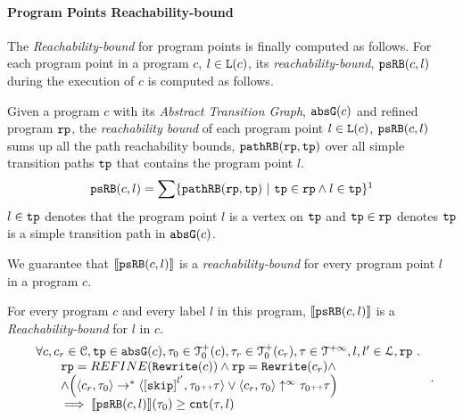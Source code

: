 \paragraph{Program Points Reachability-bound}
The \emph{Reachability-bound} for program points is finally computed as follows.
For each program point in a program $c$, $l \in \mathtt{L}(c)$,
its \emph{reachability-bound}, $\mathtt{psRB}(c, l)$ during the execution of $c$ is computed as follows.
%
\begin{defn}
\label{def:point_psrb}
Given a program $c$ with its \emph{Abstract Transition Graph}, $\mathtt{abs}{\mathtt{G}}(c)$ and refined program $\mathtt{rp}$,
the \emph{reachability bound} of each program point $l \in \mathtt{L}(c)$, $\mathtt{psRB}(c, l)$ 
sums up all the path reachability bounds, $\mathtt{pathRB}(\mathtt{rp}, \mathtt{tp})$ over all simple transition paths $\mathtt{tp}$ that contains the program point $l$.
\[ 
  \psRB(c, l) = 
  \sum
  \left\{ \inoutB(\rprog, \tpath) ~\vert~ \tpath \in \rprog \land 
  l \in \tpath \right\}\footnotemark
\]
$l \in \mathtt{tp}$ denotes that the program point $l$ is a vertex on $\mathtt{tp}$ 
and $\mathtt{tp} \in \mathtt{rp}$ denotes $\mathtt{tp}$ is a simple transition path in $\mathtt{abs}{\mathtt{G}}(c)$.
\end{defn}
We guarantee that $\llbracket \mathtt{psRB}(c, l) \rrbracket$ is a \emph{reachability-bound} for every program point $l$ in a program $c$.
\begin{thm}
\label{thm:pathsensitive_rb_soundness}
For every program ${c}$ and every label $l$ in this program,
$\llbracket \mathtt{psRB}(c, l) \rrbracket$ is a \emph{Reachability-bound} for $l$ in $c$.
%
{\small
\[
  \begin{array}{l}
    \forall c, c_r \in \cdom, \tpath \in \absG(c), \trace_0 \in \ftdom_0(c),  \trace_r \in \ftdom_0(c_r), \trace \in \tdom, l, l' \in \ldom, \rprog \st 
    \\ \qquad
    \rprog = REFINE(\algrewrite(c))
    \land 
    \rprog = \algrewrite(c_r)
    \land
    \\ \qquad
    \land
    \Big(
    \config{c_r, \trace_0} \rightarrow^* \config{\clabel{\eskip}^{l'}, \trace_0 \tracecat \trace}
    \lor \config{c_r, \trace_0} \uparrow^{\infty} \trace_0 \tracecat \trace 
    \Big)
    \\ \qquad
    \implies \econfig{\psRB(c, l)}(\trace_0) \geq \counter(\trace, l)
  \end{array}.
\]
}
\end{thm}